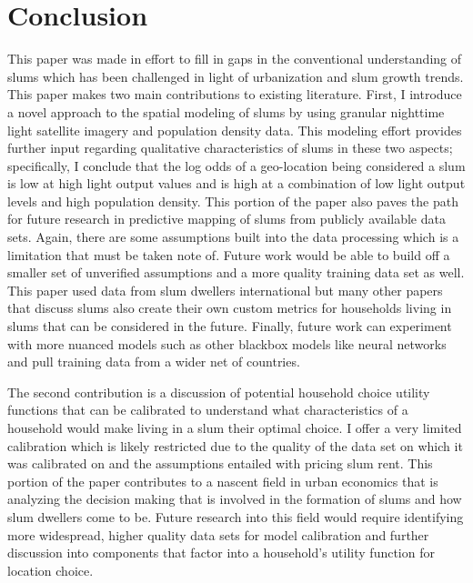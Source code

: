 \section{Conclusion}

This paper was made in effort to fill in gaps in the conventional understanding of slums which has been challenged in light of urbanization and slum growth trends. This paper makes two main contributions to existing literature. First, I introduce a novel approach to the spatial modeling of slums by using granular nighttime light satellite imagery and population density data. This modeling effort provides further input regarding qualitative characteristics of slums in these two aspects; specifically, I conclude that the log odds of a geo-location being considered a slum is low at high light output values and is high at a combination of low light output levels and high population density. This portion of the paper also paves the path for future research in predictive mapping of slums from publicly available data sets. Again, there are some assumptions built into the data processing which is a limitation that must be taken note of. Future work would be able to build off a smaller set of unverified assumptions and a more quality training data set as well. This paper used data from slum dwellers international but many other papers that discuss slums also create their own custom metrics for households living in slums that can be considered in the future. Finally, future work can experiment with more nuanced models such as other blackbox models like neural networks and pull training data from a wider net of countries.

The second contribution is a discussion of potential household choice utility functions that can be calibrated to understand what characteristics of a household would make living in a slum their optimal choice. I offer a very limited calibration which is likely restricted due to the quality of the data set on which it was calibrated on and the assumptions entailed with pricing slum rent. This portion of the paper contributes to a nascent field in urban economics that is analyzing the decision making that is involved in the formation of slums and how slum dwellers come to be. Future research into this field would require identifying more widespread, higher quality data sets for model calibration and further discussion into components that factor into a household's utility function for location choice.